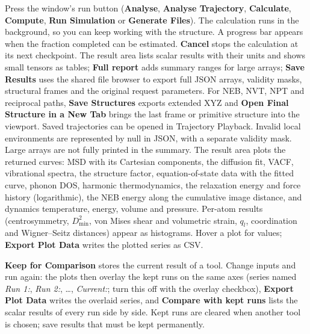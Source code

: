 Press the window's run button (\textbf{Analyse}, \textbf{Analyse Trajectory}, \textbf{Calculate}, \textbf{Compute}, \textbf{Run Simulation} or \textbf{Generate Files}). The calculation runs in the background, so you can keep working with the structure. A progress bar appears when the fraction completed can be estimated. \textbf{Cancel} stops the calculation at its next checkpoint. The result area lists scalar results with their units and shows small tensors as tables; \textbf{Full report} adds summary ranges for large arrays; \textbf{Save Results} uses the shared file browser to export full JSON arrays, validity masks, structural frames and the original request parameters. For NEB, NVT, NPT and reciprocal paths, \textbf{Save Structures} exports extended XYZ and \textbf{Open Final Structure in a New Tab} brings the last frame or primitive structure into the viewport. Saved trajectories can be opened in Trajectory Playback. Invalid local environments are represented by null in JSON, with a separate validity mask. Large arrays are not fully printed in the summary. The result area plots the returned curves: MSD with its Cartesian components, the diffusion fit, VACF, vibrational spectra, the structure factor, equation-of-state data with the fitted curve, phonon DOS, harmonic thermodynamics, the relaxation energy and force history (logarithmic), the NEB energy along the cumulative image distance, and dynamics temperature, energy, volume and pressure. Per-atom results (centrosymmetry, $D^2_{\min}$, von Mises shear and volumetric strain, $q_l$, coordination and Wigner--Seitz distances) appear as histograms. Hover a plot for values; \textbf{Export Plot Data} writes the plotted series as CSV.

\textbf{Keep for Comparison} stores the current result of a tool. Change inputs and run again: the plots then overlay the kept runs on the same axes (series named \emph{Run 1:}, \emph{Run 2:}, \ldots, \emph{Current:}; turn this off with the overlay checkbox), \textbf{Export Plot Data} writes the overlaid series, and \textbf{Compare with kept runs} lists the scalar results of every run side by side. Kept runs are cleared when another tool is chosen; save results that must be kept permanently.

